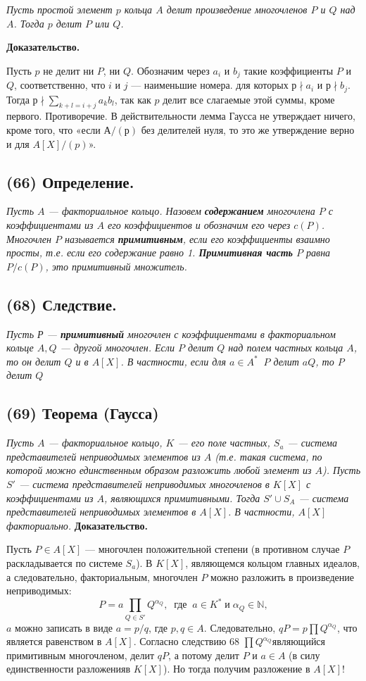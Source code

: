 \documentclass{mai_book}
\begin{document}
\textit{Пусть простой элемент $p$ кольца $A$ делит произведение многочленов
$P$ и $Q$ над $A$. Тогда $p$ делит $P$ или $Q$.}

\textbf{Доказательство.}

Пусть $p$ не делит ни $P$, ни $Q$. Обозначим через $a_{i}$ и $b_{j}$ такие коэф­фициенты $P$ и $Q$, соответственно, что $i$ и $j$ — наименьшие номера.
\newpage
для которых $р\nmid a_{i}$ и $р\nmid b_{j}$. Тогда $р\nmid\sum\nolimits_{k+l=i+j}a_{k}b_{l}$, так как $p$ делит все слагаемые этой суммы, кроме первого. Противоречие. В действительности лемма Гаусса не утверждает ничего, кроме того, что «если $А/(р)$ без делителей нуля, то это же утверждение верно и для $A[X]/(p)$».
\subsection*{(66) Определение.}

\textit{Пусть $A$ — факториальное кольцо. Назовем \textbf{содержанием} многочлена $P$ с коэффициентами из $A$  его коэффициентов и обозначим его через $c(P)$. Многочлен $P$ называется \textbf{примитивным}, если его коэффициенты взаимно просты, т.е. если его содержание равно 1. \textbf{Примитивная часть} $P$ равна $P/c(P)$, это примитивный множитель.}
\subsection*{(68) Следствие.}
\textit{Пусть Р — \textbf{примитивный} многочлен с коэффициентами в факториальном кольце $A, Q$ — другой многочлен. Если $P$ делит $Q$ над полем частных кольца $A$, то он делит $Q$ и в $A[X]$. В частности, если для $a\in A^*\;\;P$ делит $aQ$, то $P$ делит $Q$}
\subsection*{(69) Теорема (Гаусса)}
\textit{Пусть $A$ — факториальное кольцо, $K$ — его поле частных, $S_{a}$ — система представителей неприводимых элементов из $A$ (т.е. такая си­стема, по которой можно единственным образом разложить любой эле­мент из $A$). Пусть $S'$ — система представителей неприводимых многочленов в $K[X]$ с коэффициентами из $A$, являющихся примитивными. Тогда $S'\cup S_{A}$ — система представителей неприводимых элементов в
$A[X]$. В частности, $A[X]$ факториально.}
\newpage
\textbf{Доказательство.}

Пусть $P\in A[X]$ — многочлен положительной степени (в противном случае $P$ раскладывается по системе $S_{a}$). В $K[X]$, являющемся кольцом главных идеалов, а следовательно, факториальным, многочлен $P$ можно разложить в произведение неприводимых:
$$P=a\prod\limits_{Q\in S'}Q^{\alpha_{Q}},\;\;\text{где}\;\;a\in K^*\;\text{и}\;\alpha_{Q}\in\mathbb{N},$$
$a$ можно записать в виде $a=p/q$, где $p,q\in A$. Следовательно, $qP=p\prod Q^{\alpha_{Q}}$, что является равенством в $A[X]$. Согласно следствию 68 $\prod Q^{\alpha_{Q}}$являющийся примитивным многочленом, делит $qP$, а потому делит $P$ и $a\in A$ (в силу единственности разложенияв $K[X]$). Но тогда получим разложение в $A[X]$!
\end{document}
